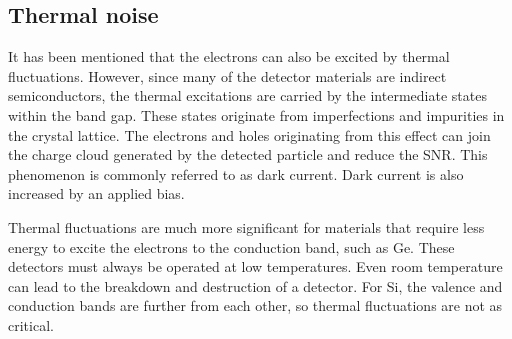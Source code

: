 \subsection{Thermal noise}
It has been mentioned that the electrons can also be excited by thermal fluctuations. However, since many of the detector materials are indirect semiconductors, the thermal excitations are carried by the intermediate states within the band gap. These states originate from imperfections and impurities in the crystal lattice. The electrons and holes originating from this effect can join the charge cloud generated by the detected particle and reduce the SNR. This phenomenon is commonly referred to as dark current. Dark current is also increased by an applied bias.
\par
Thermal fluctuations are much more significant for materials that require less energy to excite the electrons to the conduction band, such as Ge. These detectors must always be operated at low temperatures. Even room temperature can lead to the breakdown and destruction of a detector. For Si, the valence and conduction bands are further from each other, so thermal fluctuations are not as critical.


